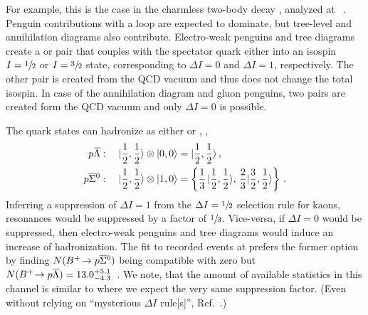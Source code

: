 For example, this is the case in the charmless two-body decay \decay{\Bu}{\proton\Lbar}, analyzed at \lhcb~\cite{BuTopLzb}.
Penguin contributions with a \decay{\bquarkbar}{\squarkbar} loop are expected to dominate, but tree-level and annihilation diagrams also contribute.
Electro-weak penguins and tree diagrams create a \uquark\uquarkbar or \dquark\dquarkbar pair that couples with the spectator quark either into an isospin $I=\sfrac{1}{2}$ or $I=\sfrac{3}{2}$ state, corresponding to $\Delta I = 0$ and $\Delta I = 1$, respectively.
The other \quark\quarkbar pair is created from the QCD vacuum and thus does not change the total isospin.
In case of the annihilation diagram and gluon penguins, two \quark\quarkbar pairs are created form the QCD vacuum and only $\Delta I=0$ is possible.

The quark states can hadronize as either \proton\Lbar or \proton\Szbar, \ie{},
\begin{align*}
    {\ensuremath{p}}{\ensuremath{\kern 0.1em\overline{\kern -0.1em\Lambda}}} &: \quad |\frac{1}{2}, \frac{1}{2}\rangle \otimes |0, 0\rangle = |\frac{1}{2}, \frac{1}{2}\rangle \,,\\
    {p}{{\overline {{\Sigma}}}{}^0} &: \quad |\frac{1}{2}, \frac{1}{2}\rangle \otimes |1, 0\rangle = \left\{ \frac{1}{3} \, |\frac{1}{2}, \frac{1}{2}\rangle,\, \frac{2}{3} |\frac{3}{2}, \frac{1}{2}\rangle \right\} \,.
\end{align*}
Inferring a suppression of $\Delta I=1$ from the $\Delta I=\sfrac{1}{2}$ selection rule for kaons, \Sz resonances would be suppressed by a factor of $\sfrac{1}{3}$. Vice-versa, if $\Delta I = 0$ would be suppressed, then electro-weak penguins and tree diagrams would induce an increase of \Sz hadronization.
The fit to recorded \decay{\Bu}{\proton\Lbar} events at \lhcb prefers the former option by finding $N({{B}^+}\!\rightarrow {\ensuremath{p}}{\ensuremath{{\overline {{\Sigma}}}{}^0}})$ being compatible with zero but $N({{B}^+}\!\rightarrow {\ensuremath{p}}{\ensuremath{\kern 0.1em\overline{\kern -0.1em\Lambda}}}) = 13.0^{+5.1}_{-4.3}$~\cite{BuTopLzb}.
We note, that the amount of available statistics in this channel is similar to \decay{\Lb}{\Dz\Lz} where we expect the very same suppression factor.
(Even without relying on \enquote{mysterious $\Delta I$ rule[s]}, \cf Ref.~\cite{DeltaIRule}.)

